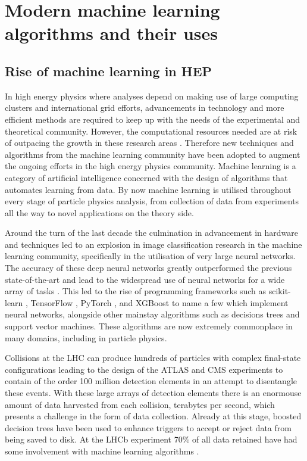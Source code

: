 \documentclass[main.tex]{subfiles}
\begin{document}
\chapter{Modern machine learning algorithms and their uses}
\label{chapter:ml}
\section{Rise of machine learning in HEP}
    In high energy physics where analyses
    depend on making use of large computing clusters
    and international grid efforts, advancements
    in technology and more efficient methods are
    required to keep up with the needs of the
    experimental and theoretical community.
    However, the computational resources needed
    are at risk of outpacing the growth in these research
    areas \cite{Bothmann:2022thx}. Therefore new techniques and
    algorithms from the machine learning community
    have been adopted to augment the ongoing efforts
    in the high energy physics community. Machine
    learning is a category of artificial intelligence
    concerned with the design of algorithms that
    automates learning from data.
    By now machine learning is utilised throughout
    every stage of particle physics analysis, from collection
    of data from experiments all the way to novel
    applications on the theory side.

    Around the turn of the last decade the culmination
    in advancement in hardware and techniques led to an
    explosion in image classification research in the
    machine learning community, specifically in the
    utilisation of very large neural networks. The accuracy
    of these deep neural networks greatly outperformed the
    previous state-of-the-art \cite{NIPS2012_c399862d,https://doi.org/10.48550/arxiv.1409.0575} and
    lead to the widespread use of neural networks for a
    wide array of tasks \cite{Schmidhuber_2015}.
    This led to the rise of programming
    frameworks such as scikit-learn \cite{scikit-learn},
    TensorFlow \cite{https://doi.org/10.48550/arxiv.1603.04467},
    PyTorch \cite{https://doi.org/10.48550/arxiv.1912.01703},
    and XGBoost \cite{Chen:2016:XST:2939672.2939785}
    to name a few which implement neural networks, alongside
    other mainstay algorithms such as decisions trees
    and support vector machines.
    These algorithms are now extremely commonplace
    in many domains, including in particle physics. 

    Collisions at the LHC can produce hundreds of
    particles with complex final-state configurations
    leading to the design of the ATLAS and CMS experiments
    to contain of the order 100 million detection elements
    in an attempt to disentangle these events. With these
    large arrays of detection elements there is an enormouse
    amount of data harvested from each collision, terabytes
    per second, which presents a challenge in the form of
    data collection.
    Already at this stage, boosted decision trees
    have been used to enhance triggers \cite{CMS:2020cmk} to accept or
    reject data from being saved to disk. At the LHCb
    experiment 70\% of all data retained have had
    some involvement with machine learning algorithms \cite{LHCb:2014set}.
\end{document}
